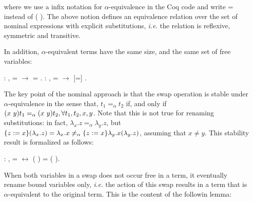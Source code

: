 \noindent where we use a infix notation for $\alpha$-equivalence in the Coq code and write  =  instead of (  ). The above notion defines an equivalence relation over the set  of nominal expressions with explicit substitutions, {\it i.e.} the  relation is reflexive, symmetric and transitive.
\begin{coqdoccode}
\coqdocemptyline
\end{coqdoccode}
In addition, $\alpha$-equivalent terms have the same size, and the same set of free variables: 
\begin{coqdoccode}
\coqdocemptyline
\coqdocnoindent
{} : \coqdockw{\ensuremath{\forall}}  ,  =  \ensuremath{\rightarrow}   =  .\coqdoceol
\coqdocemptyline
\coqdocnoindent
{}  : \coqdockw{\ensuremath{\forall}}  ,  =  \ensuremath{\rightarrow}   [=]  .\coqdoceol
\coqdocemptyline
\coqdocemptyline
\end{coqdoccode}
The key point of the nominal approach is that the swap operation is stable under $\alpha$-equivalence in the sense that, $t_1 =_\alpha t_2$ if, and only if $\swap{x}{y}{t_1} =_\alpha \swap{x}{y}{t_2}, \forall t_1, t_2, x, y$. Note that this is not true for renaming substitutions: in fact, $\lambda_x.z =_\alpha \lambda_y.z$, but $\metasub{(\lambda_x.z)}{z}{x} = \lambda_x.x \neq_\alpha \metasub{\lambda_y.x (\lambda_y.z)}{z}{x}$, assuming that $x \neq y$. This stability result is formalized as follows: 
\begin{coqdoccode}
\coqdocemptyline
\coqdocnoindent
{} : \coqdockw{\ensuremath{\forall}}    ,  =  \ensuremath{\leftrightarrow} (   ) = (   ).\coqdoceol
\coqdocemptyline
\coqdocemptyline
\end{coqdoccode}
When both variables in a swap does not occur free in a term, it eventually rename bound variables only, {\it i.e.} the action of this swap results in a term that is $\alpha$-equivalent to the original term. This is the content of the followin lemma:
